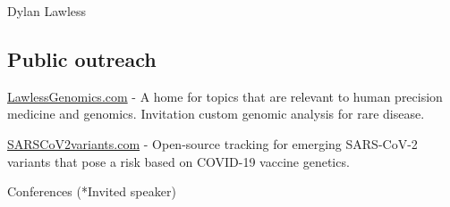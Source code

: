 \documentclass[12pt,a4paper]{article}
\begin{document}
\begin{cv}{Dylan Lawless}

\subsection*{Public outreach}
\href{https://lawlessgenomics.com}{LawlessGenomics.com} - A home for topics that are relevant to human precision medicine and genomics. Invitation custom genomic analysis for rare disease.

\noindent \href{https://sarscov2variants.com}{SARSCoV2variants.com} - Open-source tracking for emerging SARS-CoV-2 variants that pose a risk based on COVID-19 vaccine genetics.

\begin{cvlist}{Conferences \textnormal{(*Invited speaker)}} 


\end{cvlist}
\end{cv}
\end{document}
